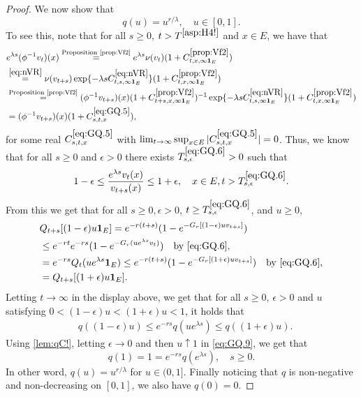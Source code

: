 \documentclass[12pt,a4paper]{amsart}
\numberwithin{equation}{section}
\theoremstyle{plain}
\theoremstyle{definition}
\theoremstyle{remark}
\begin{document}
\begin{proof}
	We now show that
\begin{equation} \label{eq:GQ}
	q(u) = u^{r/\lambda},\quad u\in [0,1].
\end{equation}
	To see this, note that for all $s\geq 0$, $t>T^{\eqref{asp:H4!}}$ and $x\in E$, we have that
	\begin{align}
	& e^{\lambda s}(\phi^{-1}v_t)(x)
	\overset{\text{Proposition \ref{prop:Vf2}}}= e^{\lambda s}\nu(v_{t})(1+ C^{\ref{prop:Vf2}}_{t,x,\infty \mathbf 1_E})
	\\&\overset{\eqref{eq:nVR}}=\nu(v_{t+s}) \exp\{-\lambda sC^{\eqref{eq:nVR}}_{t,s,\infty \mathbf 1_E}\} (1+ C^{\ref{prop:Vf2}}_{t,x,\infty \mathbf 1_E})
	\\&\overset{\text{Proposition \ref{prop:Vf2}}}= (\phi^{-1}v_{t+s})(x) (1+ C^{\ref{prop:Vf2}}_{t+s,x,\infty \mathbf 1_E})^{-1} \exp\{-\lambda sC^{\eqref{eq:nVR}}_{t,s,\infty \mathbf 1_E}\} (1+ C^{\ref{prop:Vf2}}_{t,x,\infty \mathbf 1_E})
	\\& \label{eq:GQ.5}= (\phi^{-1}v_{t+s})(x) (1+C_{s,t,x}^{\eqref{eq:GQ.5}}),
	\end{align}
	for some real $C_{s,t,x}^{\eqref{eq:GQ.5}}$ with $\lim_{t\to \infty}\sup_{x\in E} |C_{s,t,x}^{\eqref{eq:GQ.5}}| =0$.
	Thus, we know that for all $s\geq 0$ and $\epsilon >0$ there exists $T^{\eqref{eq:GQ.6}}_{s,\epsilon}>0$ such that
	\begin{equation} \label{eq:GQ.6}
	1-\epsilon
	\leq \frac{e^{\lambda s}v_t(x)}{v_{t+s}(x)}
	\leq 1+\epsilon,
	\quad x\in E, t> T^{\eqref{eq:GQ.6}}_{s,\epsilon}.
	\end{equation}
	From this we get that for all $s\geq 0, \epsilon > 0$, $t\ge T^{\eqref{eq:GQ.6}}_{s,\epsilon}$, and $u\geq 0$,
	\begin{align}
	& Q_{t+s}[ (1-\epsilon)u \mathbf 1_E ]
	= e^{-r (t+s)}( 1-e^{-G_r[(1-\epsilon)uv_{t+s}]} )
	\\ & \leq e^{-r t} e^{-r s}( 1- e^{-G_r(ue^{\lambda s}v_t)} )\quad\text{by \eqref{eq:GQ.6}},
	\\ &= e^{-r s}Q_t(ue^{\lambda s} \mathbf 1_E)
	\leq e^{-r(t+s)}( 1-e^{-G_r[(1+\epsilon)uv_{t+s}]})\quad\text{by \eqref{eq:GQ.6}},
	\\\label{eq:GQ.8}&= Q_{t+s}[ (1+\epsilon)u \mathbf 1_E ].
	\end{align}
	Letting $t\to \infty$ in the display above, we get that for all $s\geq 0$, $\epsilon > 0$ and $u$ satisfying $0 < (1 - \epsilon) u < (1+\epsilon)u < 1$, it holds that
\begin{align} \label{eq:GQ.9}
	& q((1-\epsilon)u)
	\leq e^{-r s}q(u e^{\lambda s})
	\leq q((1+\epsilon)u).
\end{align}
	Using \eqref{lem:qC!}, letting $\epsilon \to 0$ and then $u \uparrow 1$ in \eqref{eq:GQ.9}, we get that
\[
	q(1)
	=1
	= e^{- r s} q(e^{\lambda s}),
	\quad s \geq 0.
\]
	In other word, $q(u) = u^{r/\lambda}$ for $u\in (0,1]$.
	Finally noticing that $q$ is non-negative and non-decreasing on $[0,1]$, we also have $q(0) = 0$.


\end{proof}
\end{document}
